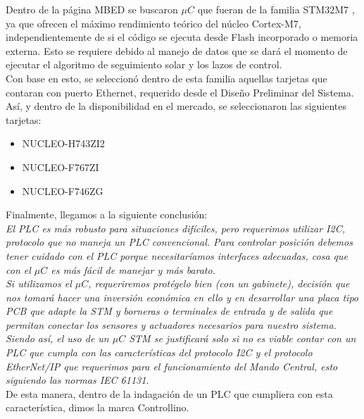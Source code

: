 Dentro de la página MBED se buscaron $ \mu C $ que fueran de la familia STM32M7 \cite{DDC6}, ya que ofrecen el máximo rendimiento teórico del núcleo Cortex-M7, independientemente de si el código se ejecuta desde Flash incorporado o memoria externa. Esto se requiere debido al manejo de datos que se dará el momento de ejecutar el algoritmo de seguimiento solar y los lazos de control. \\

Con base en esto, se seleccionó dentro de esta familia aquellas tarjetas que contaran con puerto Ethernet, requerido desde el Diseño Preliminar del Sistema. Así, y dentro de la disponibilidad en el mercado, se seleccionaron las siguientes tarjetas:

\begin{multicols}{3}
	\begin{itemize}
		\item NUCLEO-H743ZI2
		\item NUCLEO-F767ZI
		\item NUCLEO-F746ZG
	\end{itemize}
\end{multicols}
Finalmente, llegamos a la siguiente conclusión:\\

\textit{El PLC es más robusto para situaciones difíciles, pero requerimos utilizar I2C, protocolo que no maneja un PLC convencional. Para controlar posición debemos tener cuidado con el PLC porque necesitaríamos interfaces adecuadas, cosa que con el $ \mu C $ es más fácil de manejar y más barato.} \\

\textit{Si utilizamos el $ \mu C $, requeriremos protégelo bien (con un gabinete), decisión que nos tomará hacer una inversión económica en ello y en desarrollar una placa tipo PCB que adapte la STM y borneras o terminales de entrada y de salida que permitan conectar los sensores y actuadores necesarios para nuestro sistema. Siendo así, el uso de un $ \mu C $ STM se justificará solo si no es viable contar con un PLC que cumpla con las características del protocolo I2C y el protocolo EtherNet/IP que requerimos para el funcionamiento del Mando Central, esto siguiendo las normas IEC 61131.}\\

De esta manera, dentro de la indagación de un PLC que cumpliera con esta característica, dimos la marca Controllino.\\

